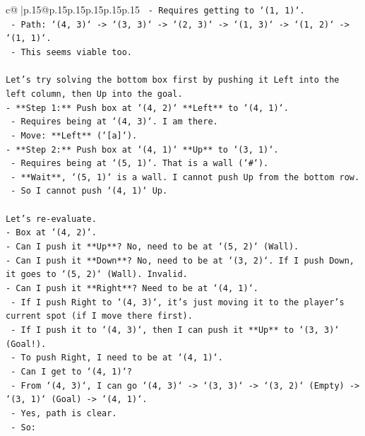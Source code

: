 \documentclass{article}
\begin{document}
{\begin{supertabular}{c@{$\;$}|p{.15\linewidth}@{}p{.15\linewidth}p{.15\linewidth}p{.15\linewidth}p{.15\linewidth}p{.15\linewidth}}
{{{\texttt{    {-}   Requires getting to `(1, 1)`.} \\
\texttt{    {-}   Path: `(4, 3)` {-}> `(3, 3)` {-}> `(2, 3)` {-}> `(1, 3)` {-}> `(1, 2)` {-}> `(1, 1)`.} \\
\texttt{    {-}   This seems viable too.} \\
\\ 
\texttt{Let's try solving the bottom box first by pushing it Left into the left column, then Up into the goal.} \\
\texttt{{-}   **Step 1:** Push box at `(4, 2)` **Left** to `(4, 1)`.} \\
\texttt{    {-}   Requires being at `(4, 3)`. I am there.} \\
\texttt{    {-}   Move: **Left** (`{[}a{]}`).} \\
\texttt{{-}   **Step 2:** Push box at `(4, 1)` **Up** to `(3, 1)`.} \\
\texttt{    {-}   Requires being at `(5, 1)`. That is a wall (`\#`).} \\
\texttt{    {-}   **Wait**, `(5, 1)` is a wall. I cannot push Up from the bottom row.} \\
\texttt{    {-}   So I cannot push `(4, 1)` Up.} \\
\\ 
\texttt{Let's re{-}evaluate.} \\
\texttt{{-}   Box at `(4, 2)`.} \\
\texttt{{-}   Can I push it **Up**? No, need to be at `(5, 2)` (Wall).} \\
\texttt{{-}   Can I push it **Down**? No, need to be at `(3, 2)`. If I push Down, it goes to `(5, 2)` (Wall). Invalid.} \\
\texttt{{-}   Can I push it **Right**? Need to be at `(4, 1)`.} \\
\texttt{    {-}   If I push Right to `(4, 3)`, it's just moving it to the player's current spot (if I move there first).} \\
\texttt{    {-}   If I push it to `(4, 3)`, then I can push it **Up** to `(3, 3)` (Goal!).} \\
\texttt{    {-}   To push Right, I need to be at `(4, 1)`.} \\
\texttt{    {-}   Can I get to `(4, 1)`?} \\
\texttt{        {-}   From `(4, 3)`, I can go `(4, 3)` {-}> `(3, 3)` {-}> `(3, 2)` (Empty) {-}> `(3, 1)` (Goal) {-}> `(4, 1)`.} \\
\texttt{        {-}   Yes, path is clear.} \\
\texttt{    {-}   So:} \\
}}}
\end{supertabular}}
\end{document}
